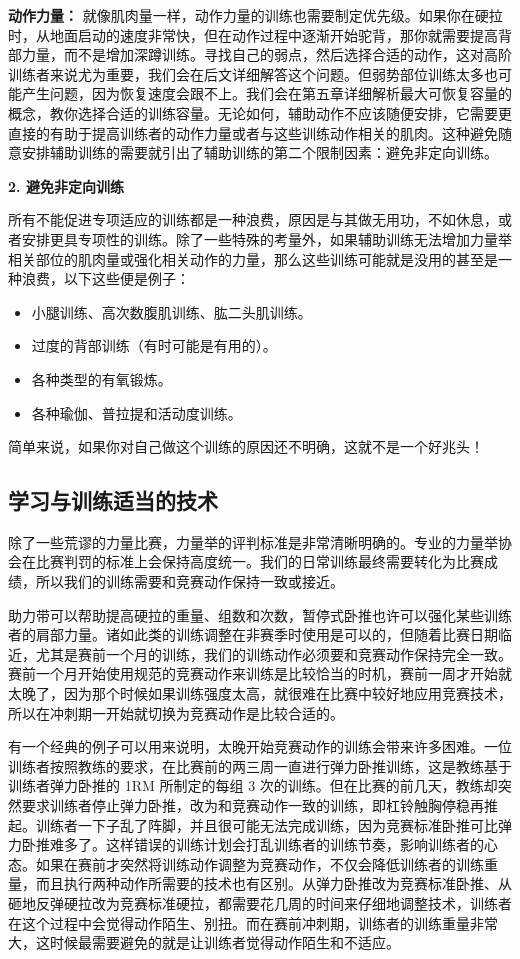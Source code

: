 \documentclass[fontset=fandol, a4paper, 12pt, openright]{ctexbook}
\begin{document}
\textbf{动作力量：} 就像肌肉量一样，动作力量的训练也需要制定优先级。如果你在硬拉时，从地面启动的速度非常快，但在动作过程中逐渐开始驼背，那你就需要提高背部力量，而不是增加深蹲训练。寻找自己的弱点，然后选择合适的动作，这对高阶训练者来说尤为重要，我们会在后文详细解答这个问题。但弱势部位训练太多也可能产生问题，因为恢复速度会跟不上。我们会在第五章详细解析最大可恢复容量的概念，教你选择合适的训练容量。无论如何，辅助动作不应该随便安排，它需要更直接的有助于提高训练者的动作力量或者与这些训练动作相关的肌肉。这种避免随意安排辅助训练的需要就引出了辅助训练的第二个限制因素：避免非定向训练。

\textbf{2. 避免非定向训练}

所有不能促进专项适应的训练都是一种浪费，原因是与其做无用功，不如休息，或者安排更具专项性的训练。除了一些特殊的考量外，如果辅助训练无法增加力量举相关部位的肌肉量或强化相关动作的力量，那么这些训练可能就是没用的甚至是一种浪费，以下这些便是例子：
\begin{itemize}
    \item 小腿训练、高次数腹肌训练、肱二头肌训练。
    \item 过度的背部训练（有时可能是有用的）。
    \item 各种类型的有氧锻炼。
    \item 各种瑜伽、普拉提和活动度训练。
\end{itemize}
简单来说，如果你对自己做这个训练的原因还不明确，这就不是一个好兆头！

\subsection{学习与训练适当的技术}

除了一些荒谬的力量比赛，力量举的评判标准是非常清晰明确的。专业的力量举协会在比赛判罚的标准上会保持高度统一。我们的日常训练最终需要转化为比赛成绩，所以我们的训练需要和竞赛动作保持一致或接近。

助力带可以帮助提高硬拉的重量、组数和次数，暂停式卧推也许可以强化某些训练者的肩部力量。诸如此类的训练调整在非赛季时使用是可以的，但随着比赛日期临近，尤其是赛前一个月的训练，我们的训练动作必须要和竞赛动作保持完全一致。赛前一个月开始使用规范的竞赛动作来训练是比较恰当的时机，赛前一周才开始就太晚了，因为那个时候如果训练强度太高，就很难在比赛中较好地应用竞赛技术，所以在冲刺期一开始就切换为竞赛动作是比较合适的。

有一个经典的例子可以用来说明，太晚开始竞赛动作的训练会带来许多困难。一位训练者按照教练的要求，在比赛前的两三周一直进行弹力卧推训练，这是教练基于训练者弹力卧推的 1RM 所制定的每组 3 次的训练。但在比赛的前几天，教练却突然要求训练者停止弹力卧推，改为和竞赛动作一致的训练，即杠铃触胸停稳再推起。训练者一下子乱了阵脚，并且很可能无法完成训练，因为竞赛标准卧推可比弹力卧推难多了。这样错误的训练计划会打乱训练者的训练节奏，影响训练者的心态。如果在赛前才突然将训练动作调整为竞赛动作，不仅会降低训练者的训练重量，而且执行两种动作所需要的技术也有区别。从弹力卧推改为竞赛标准卧推、从砸地反弹硬拉改为竞赛标准硬拉，都需要花几周的时间来仔细地调整技术，训练者在这个过程中会觉得动作陌生、别扭。而在赛前冲刺期，训练者的训练重量非常大，这时候最需要避免的就是让训练者觉得动作陌生和不适应。
\end{document}

